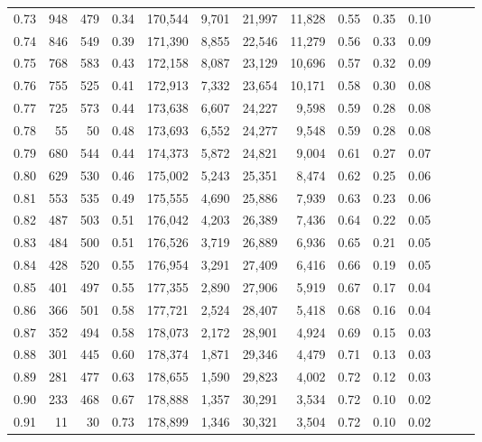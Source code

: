 \begin{tabular}{rrrrrrrrrrrrrr}
0.73 &    948 &  479 &  0.34 &  170,544 &    9,701 &  21,997 &  11,828 &  0.55 &  0.35 &      0.10 \\
0.74 &    846 &  549 &  0.39 &  171,390 &    8,855 &  22,546 &  11,279 &  0.56 &  0.33 &      0.09 \\
0.75 &    768 &  583 &  0.43 &  172,158 &    8,087 &  23,129 &  10,696 &  0.57 &  0.32 &      0.09 \\
0.76 &    755 &  525 &  0.41 &  172,913 &    7,332 &  23,654 &  10,171 &  0.58 &  0.30 &      0.08 \\
0.77 &    725 &  573 &  0.44 &  173,638 &    6,607 &  24,227 &   9,598 &  0.59 &  0.28 &      0.08 \\
0.78 &     55 &   50 &  0.48 &  173,693 &    6,552 &  24,277 &   9,548 &  0.59 &  0.28 &      0.08 \\
0.79 &    680 &  544 &  0.44 &  174,373 &    5,872 &  24,821 &   9,004 &  0.61 &  0.27 &      0.07 \\
0.80 &    629 &  530 &  0.46 &  175,002 &    5,243 &  25,351 &   8,474 &  0.62 &  0.25 &      0.06 \\
0.81 &    553 &  535 &  0.49 &  175,555 &    4,690 &  25,886 &   7,939 &  0.63 &  0.23 &      0.06 \\
0.82 &    487 &  503 &  0.51 &  176,042 &    4,203 &  26,389 &   7,436 &  0.64 &  0.22 &      0.05 \\
0.83 &    484 &  500 &  0.51 &  176,526 &    3,719 &  26,889 &   6,936 &  0.65 &  0.21 &      0.05 \\
0.84 &    428 &  520 &  0.55 &  176,954 &    3,291 &  27,409 &   6,416 &  0.66 &  0.19 &      0.05 \\
0.85 &    401 &  497 &  0.55 &  177,355 &    2,890 &  27,906 &   5,919 &  0.67 &  0.17 &      0.04 \\
0.86 &    366 &  501 &  0.58 &  177,721 &    2,524 &  28,407 &   5,418 &  0.68 &  0.16 &      0.04 \\
0.87 &    352 &  494 &  0.58 &  178,073 &    2,172 &  28,901 &   4,924 &  0.69 &  0.15 &      0.03 \\
0.88 &    301 &  445 &  0.60 &  178,374 &    1,871 &  29,346 &   4,479 &  0.71 &  0.13 &      0.03 \\
0.89 &    281 &  477 &  0.63 &  178,655 &    1,590 &  29,823 &   4,002 &  0.72 &  0.12 &      0.03 \\
0.90 &    233 &  468 &  0.67 &  178,888 &    1,357 &  30,291 &   3,534 &  0.72 &  0.10 &      0.02 \\
0.91 &     11 &   30 &  0.73 &  178,899 &    1,346 &  30,321 &   3,504 &  0.72 &  0.10 &      0.02 \\

\end{tabular}
